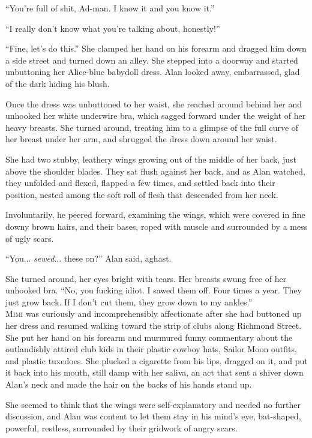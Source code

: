 ``You're full of shit, Ad-man.  I know it and you know it.''

``I really don't know what you're talking about, honestly!''

``Fine, let's do this.'' She clamped her hand on his forearm and
dragged him down a side street and turned down an alley.  She stepped
into a doorway and started unbuttoning her Alice-blue babydoll dress. 
Alan looked away, embarrassed, glad of the dark hiding his blush.

Once the dress was unbuttoned to her waist, she reached around behind
her and unhooked her white underwire bra, which sagged forward under
the weight of her heavy breasts.  She turned around, treating him to a
glimpse of the full curve of her breast under her arm, and shrugged
the dress down around her waist.

She had two stubby, leathery wings growing out of the middle of her
back, just above the shoulder blades.  They sat flush against her
back, and as Alan watched, they unfolded and flexed, flapped a few
times, and settled back into their position, nested among the soft
roll of flesh that descended from her neck.

Involuntarily, he peered forward, examining the wings, which were
covered in fine downy brown hairs, and their bases, roped with muscle
and surrounded by a mess of ugly scars.

``You...  \textit{sewed}...  these on?'' Alan said, aghast.

She turned around, her eyes bright with tears.  Her breasts swung free
of her unhooked bra.  ``No, you fucking idiot.  I sawed them off. 
Four times a year.  They just grow back.  If I don't cut them, they
grow down to my ankles.''
\\
\lettrine[lines=3, lhang=.5, nindent=0pt, findent=2pt]{M}{imi} was curiously and incomprehensibly affectionate after she had
buttoned up her dress and resumed walking toward the strip of clubs
along Richmond Street.  She put her hand on his forearm and murmured
funny commentary about the outlandishly attired club kids in their
plastic cowboy hats, Sailor Moon outfits, and plastic tuxedoes.  She
plucked a cigarette from his lips, dragged on it, and put it back into
his mouth, still damp with her saliva, an act that sent a shiver down
Alan's neck and made the hair on the backs of his hands stand up.

She seemed to think that the wings were self-explanatory and needed no
further discussion, and Alan was content to let them stay in his
mind's eye, bat-shaped, powerful, restless, surrounded by their
gridwork of angry scars.


